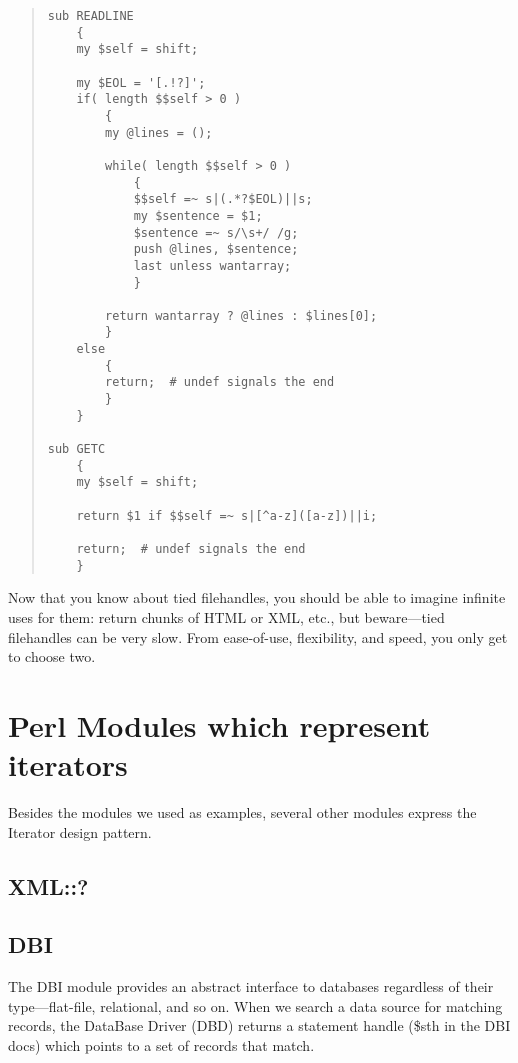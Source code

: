 \begin{quote}
\begin{verbatim}
sub READLINE
    {
    my $self = shift;
    
    my $EOL = '[.!?]';
    if( length $$self > 0 )
        {
        my @lines = ();
        
        while( length $$self > 0 )
            {
            $$self =~ s|(.*?$EOL)||s;
            my $sentence = $1;
            $sentence =~ s/\s+/ /g;
            push @lines, $sentence;
            last unless wantarray;
            }

        return wantarray ? @lines : $lines[0];            
        }
    else
        {    
        return;  # undef signals the end
        }
    }
    
sub GETC
    {
    my $self = shift;
    
    return $1 if $$self =~ s|[^a-z]([a-z])||i;
    
    return;  # undef signals the end
    }
\end{verbatim}
\end{quote}

Now that you know about tied filehandles, you should be able to imagine
infinite uses for them: return chunks of HTML or XML, etc., but beware---tied
filehandles can be very slow.  From ease-of-use, flexibility, and speed, you
only get to choose two.

    \section{Perl Modules which represent iterators}
    
Besides the modules we used as examples, several other modules express the
Iterator design pattern.

    \subsection{XML::?}
    
    \subsection{DBI}

The DBI module provides an abstract interface to databases regardless
of their type---flat-file, relational, and so on.  When we search a 
data source for matching records, the DataBase Driver (DBD) returns
a statement handle (\$sth in the DBI docs) which points to a set
of records that match.

